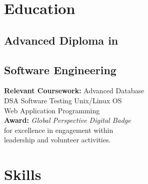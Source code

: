 \documentclass[]{DavidPietrocola-resume}
\begin{document}
\lastupdated



\begin{minipage}[t]{0.37\textwidth} 


\section{Education} 

\subsection{Advanced Diploma in}
\subsection{Software Engineering}

{\bf Relevant Coursework:} Advanced Database \\ DSA \textbullet{} Software Testing \textbullet{} Unix/Linux OS \\ Web Application Programming\\
{\bf Award:} \textit{Global Perspective Digital Badge}\\for excellence in engagement within\\leadership and volunteer activities. 



\section{Skills}

\end{minipage}
\end{document}
